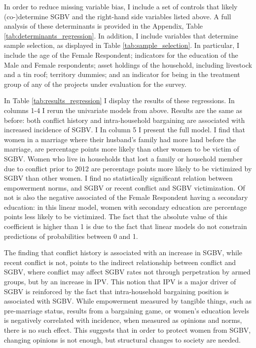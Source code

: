 \documentclass[10pt,a4paper,abstract=on]{scrartcl} %
\begin{document}
In order to reduce missing variable bias, I include a set of controls that likely (co-)determine SGBV and the right-hand side variables listed above. A full analysis of these determinants is provided in the Appendix, Table \ref{tab:determinants_regression}. In addition, I include variables that determine sample selection, as displayed in Table \ref{tab:sample_selection}. In particular, I include the age of the Female Respondent; indicators for the education of the Male and Female respondents; asset holdings of the household, including livestock and a tin roof; territory dummies; and an indicator for being in the treatment group of any of the projects under evaluation for the survey.

In Table \ref{tab:results_regression} I display the results of these regressions. In columns 1-4 I rerun the univariate models from above. Results are the same as before: both conflict history and intra-household bargaining are associated with increased incidence of SGBV. I In column 5 I present the full model. I find that women in a marriage where their husband's family had more land before the marriage, are  percentage points more likely than other women to be victim of SGBV. Women who live in households that lost a family or household member due to conflict prior to 2012 are  percentage points more likely to be victimized by SGBV than other women. I find no statistically significant relation between empowerment norms, and SGBV or recent conflict and SGBV victimization. Of not is also the negative associated of the Female Respondent having a secondary education: in this linear model, women with secondary education are  percentage points less likely to be victimized. The fact that the absolute value of this coefficient is higher than 1 is due to the fact that linear models do not constrain predictions of probabilities between 0 and 1.

The finding that conflict history is associated with an increase in SGBV, while recent conflict is not, points to the indirect relationship between conflict and SGBV, where conflict may affect SGBV rates not through perpetration by armed groups, but by an increase in IPV. This notion that IPV is a major driver of SGBV is reinforced by the fact that intra-household bargaining position is associated with SGBV. While empowerment measured by tangible things, such as pre-marriage status, results from a bargaining game, or women's education levels is negatively correlated with incidence, when measured as opinions and norms, there is no such effect. This suggests that in order to protect women from SGBV, changing opinions is not enough, but structural changes to society are needed. 
\end{document}
